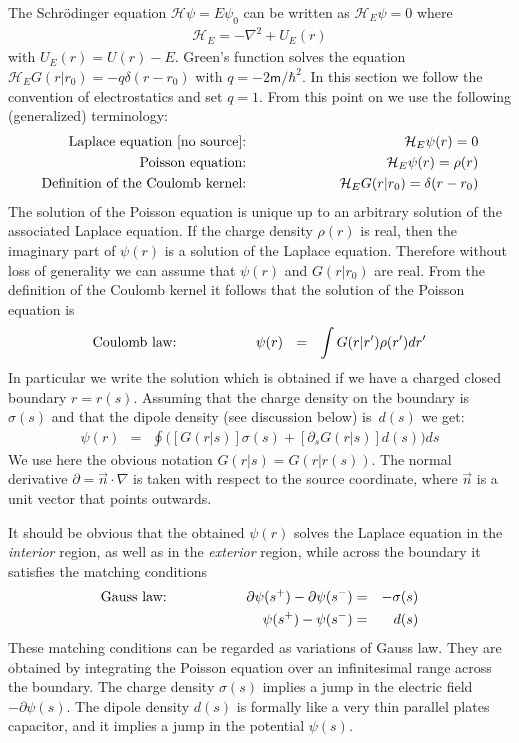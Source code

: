 \documentclass[onecolumn,fleqn]{revtex4}
\newcommand{\mass}{\mathsf{m}}
\newcommand{\beq}{\begin{eqnarray}}
\newcommand{\eeq}{\end{eqnarray}}
\begin{document}
The Schr\"{o}dinger equation $\mathcal{H}\psi=E\psi_0$ can be 
written as $\mathcal{H}_E\psi=0$ where 
\beq
\mathcal{H}_E=-\nabla^2 + U_E(r) 
\eeq
with $U_E(r)=U(r)-E$. Green's function solves 
the equation $\mathcal{H}_E G(r|r_0)=-q\delta(r-r_0)$ 
with $q=-2\mass/\hbar^2$. In this section we follow the convention 
of electrostatics and set $q=1$. From this point on we use 
the following (generalized) terminology:
\beq
\mbox{Laplace equation [no source]:} 
\hspace*{2cm} &&
\mathcal{H}_E \psi(r) = 0
\\
\mbox{Poisson equation:} 
\hspace*{2cm} &&
\mathcal{H}_E \psi(r) = \rho(r)
\\
\mbox{Definition of the Coulomb kernel:}
\hspace*{2cm} &&
\mathcal{H}_E G(r|r_0)=\delta(r-r_0) 
\eeq
The solution of the Poisson equation is unique 
up to an arbitrary solution of the associated Laplace equation.  
If the charge density $\rho(r)$ is real, 
then the imaginary part of $\psi(r)$ is a solution 
of the Laplace equation. Therefore without loss of generality we 
can assume that $\psi(r)$ and $G(r|r_0)$ are real. 
From the definition of the Coulomb kernel it follows 
that the solution of the Poisson equation is 
\beq
\mbox{Coulomb law:}
\hspace*{2cm}
\psi(r) \ \ = \ \ \int G(r|r') \rho(r') dr'
\eeq
In particular we write the solution which is obtained 
if we have a charged closed boundary ${r=r(s)}$. 
Assuming that the charge density on the boundary   
is~$\sigma(s)$ and that the dipole density 
(see discussion below) is~$d(s)$ we get:
\beq
\psi(r) \ \ = \ \ 
\oint \Big( [G(r|s)] \sigma(s) + [\partial_s G(r|s)] d(s) \Big) ds
\eeq
We use here the obvious notation ${G(r|s)=G(r|r(s))}$.  
The normal derivative ${\partial=\vec{n}\cdot\nabla}$ 
is taken with respect to the source coordinate,  
where $\vec{n}$ is a unit vector that points outwards.



It should be obvious that the obtained $\psi(r)$ solves 
the Laplace equation in the {\em interior} region, 
as well as in the {\em exterior} region, 
while across the boundary it satisfies the matching conditions    
\beq
\mbox{Gauss law:} 
\hspace*{2cm} 
\partial\psi(s^{+})-\partial\psi(s^{-}) &=& -\sigma(s)
\\
\psi(s^{+}) - \psi(s^{-}) &=& d(s)
\eeq
These matching conditions can be regarded 
as variations of Gauss law. They are obtained 
by integrating the Poisson equation 
over an infinitesimal range across the boundary.  
The charge density  $\sigma(s)$ implies 
a jump in the electric field $-\partial\psi(s)$.
The dipole density $d(s)$ is formally like a very 
thin parallel plates capacitor, and it implies 
a jump in the potential $\psi(s)$. 
\end{document}
